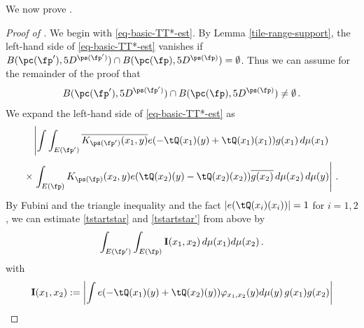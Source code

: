 We now prove .
\begin{proof}[Proof of ]
    \leanok
We begin with \eqref{eq-basic-TT*-est}.
By Lemma \ref{tile-range-support}, the left-hand side of \eqref{eq-basic-TT*-est} vanishes if
$B(\pc(\fp'),5D^{\ps(\fp')}) \cap B(\pc(\fp),5D^{\ps(\fp)}) = \emptyset$.
Thus we can assume for the remainder of the proof that
\begin{equation}
        \label{intersec5B}
        B(\pc(\fp'),5D^{\ps(\fp')}) \cap B(\pc(\fp),5D^{\ps(\fp)}) \neq \emptyset\,.
\end{equation}
We expand the left-hand side of \eqref{eq-basic-TT*-est} as
\begin{equation}\label{tstartstar}
\left|\int \int_{E(\fp')} \overline{K_{\ps(\fp')}(x_1,y)}e(-\tQ(x_1)(y)+
    \tQ(x_1)(x_1))g(x_1)\, d\mu(x_1) \right.
\end{equation}
\begin{equation}\label{tstartstar'}
 \times \left.\int_{E(\fp)} {K_{\ps(\fp)}(x_2,y)}e(\tQ(x_2)(y)
    -\tQ(x_2)(x_2))\overline{g(x_2)}\, d\mu(x_2)\, d\mu(y)\right|\, .
\end{equation}
By Fubini and the triangle inequality and
the fact $|e(\tQ(x_i)(x_i))|=1$ for $i=1,2$, we can estimate
\eqref{tstartstar} and \eqref{tstartstar'} from above by
\begin{equation}\label{eqa1}
    \int_{E(\fp')} \int_{E(\fp)} {\bf I}(x_1, x_2)\, d\mu(x_1)d\mu(x_2)\,.
\end{equation}
with
\begin{equation}
    {\bf I}(x_1, x_2):=
    \left|\int
    e(-\tQ(x_1)(y)+\tQ(x_2)(y))\varphi_{x_1,x_2}(y)
    d\mu(y) \, g(x_1)g(x_2)\right|
\end{equation}



\end{proof}

